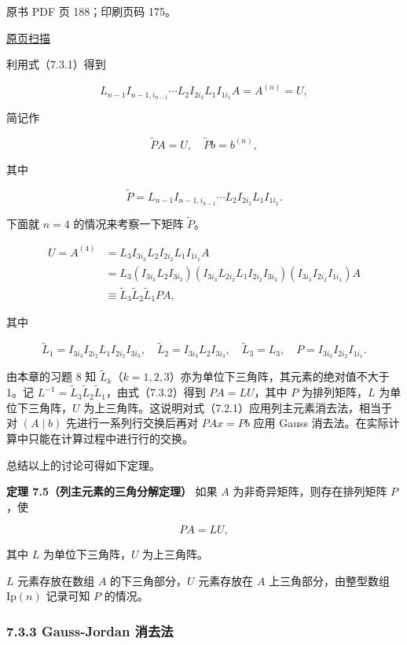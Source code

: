 原书 PDF 页 188；印刷页码 175。

\href{source-images/pdf-188.jpeg}{原页扫描}

利用式（7.3.1）得到

\[L_{n-1}I_{n-1,i_{n-1}}\cdots L_2I_{2i_2}L_1I_{1i_1}A=A^{(n)}=U,\]

简记作

\[\widetilde{P}A=U,\quad\widetilde{P}b=b^{(n)},\]

其中

\[\widetilde{P}=L_{n-1}I_{n-1,i_{n-1}}\cdots L_2I_{2i_2}L_1I_{1i_1}.\]

下面就 \(n=4\) 的情况来考察一下矩阵 \(\widetilde{P}\)。

\[
\begin{aligned}
U=A^{(4)}&=L_3I_{3i_3}L_2I_{2i_2}L_1I_{1i_1}A\\
&=L_3(I_{3i_3}L_2I_{3i_3})(I_{3i_3}L_{2i_2}L_1I_{2i_2}I_{3i_3})(I_{3i_3}I_{2i_2}I_{1i_1})A\\
&\equiv\widetilde{L}_3\widetilde{L}_2\widetilde{L}_1PA,
\end{aligned}
\tag{7.3.2}
\]

其中

\[\widetilde{L}_1=I_{3i_3}I_{2i_2}L_1I_{2i_2}I_{3i_3},\quad
\widetilde{L}_2=I_{3i_3}L_2I_{3i_3},\quad
\widetilde{L}_3=L_3,\quad P=I_{3i_3}I_{2i_2}I_{1i_1}.\]

由本章的习题 8 知 \(\widetilde{L}_k\)（\(k=1,2,3\)）亦为单位下三角阵，其元素的绝对值不大于 1。记 \(L^{-1}=\widetilde{L}_3\widetilde{L}_2\widetilde{L}_1\)，由式（7.3.2）得到 \(PA=LU\)，其中 \(P\) 为排列矩阵，\(L\) 为单位下三角阵，\(U\) 为上三角阵。这说明对式（7.2.1）应用列主元素消去法，相当于对 \((A\mid b)\) 先进行一系列行交换后再对 \(PAx=Pb\) 应用 Gauss 消去法。在实际计算中只能在计算过程中进行行的交换。

总结以上的讨论可得如下定理。

\textbf{定理 7.5（列主元素的三角分解定理）} 如果 \(A\) 为非奇异矩阵，则存在排列矩阵 \(P\)，使

\[PA=LU,\]

其中 \(L\) 为单位下三角阵，\(U\) 为上三角阵。

\(L\) 元素存放在数组 \(A\) 的下三角部分，\(U\) 元素存放在 \(A\) 上三角部分，由整型数组 \(\mathrm{Ip}(n)\) 记录可知 \(P\) 的情况。

\subsubsection{7.3.3 Gauss-Jordan 消去法}\label{ch07a-gauss-jordan-ux6d88ux53bbux6cd5}

